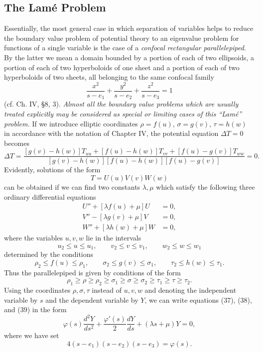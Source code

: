 \subsection{The Lam\'e Problem}
Essentially, the most general case in which separation of variables helps to reduce the boundary value problem of potential theory to an eigenvalue problem for functions of a single variable is the case of a \emph{confocal rectangular parallelepiped}. By the latter we mean a domain bounded by a portion of each of two ellipsoids, a portion of each of two hyperboloids of one sheet and a portion of each of two hyperboloids of two sheets, all belonging to the same confocal family
\[
\frac{x^2}{s-e_1}+\frac{y^2}{s-e_2}+\frac{z^2}{s-e_3}=1
\]
(cf. Ch. IV, \S8, 3). \emph{Almost all the boundary value problems which are usually treated explicitly may be considered as special or limiting cases of this ``Lam\'e'' problem.} If we introduce elliptic coordinates $\rho=f(u)$, $\sigma=g(v)$, $\tau=h(w)$ in accordance with the notation of Chapter IV, the potential equation $\Delta T=0$ becomes
\[
\Delta T=
\frac{[g(v)-h(w)]T_{uu}+[f(u)-h(w)]T_{vv}+[f(u)-g(v)]T_{ww}}
{[g(v)-h(w)][f(u)-h(w)][f(u)-g(v)]}=0.
\]
Evidently, solutions of the form
\[
T=U(u)V(v)W(w)
\]
can be obtained if we can find two constants $\lambda,\mu$ which satisfy the following three ordinary differential equations
\begin{align}
U''+[\lambda f(u)+\mu]U&=0, \tag{37}\\
V''-[\lambda g(v)+\mu]V&=0, \tag{38}\\
W''+[\lambda h(w)+\mu]W&=0, \tag{39}
\end{align}
where the variables $u,v,w$ lie in the intervals
\[
u_2\le u\le u_1,\qquad v_2\le v\le v_1,\qquad w_2\le w\le w_1
\]
determined by the conditions
\[
\rho_2\le f(u)\le\rho_1,\qquad
\sigma_2\le g(v)\le\sigma_1,\qquad
\tau_2\le h(w)\le\tau_1.
\]
Thus the parallelepiped is given by conditions of the form
\[
\rho_1\ge\rho\ge\rho_2\ge\sigma_1\ge\sigma\ge\sigma_2\ge\tau_1\ge\tau\ge\tau_2.
\]
Using the coordinates $\rho,\sigma,\tau$ instead of $u,v,w$ and denoting the independent variable by $s$ and the dependent variable by $Y$, we can write equations (37), (38), and (39) in the form
\[
\varphi(s)\frac{d^2Y}{ds^2}+\frac{\varphi'(s)}2\frac{dY}{ds}+(\lambda s+\mu)Y=0,
\]
where we have set
\[
4(s-e_1)(s-e_2)(s-e_3)=\varphi(s).
\]
